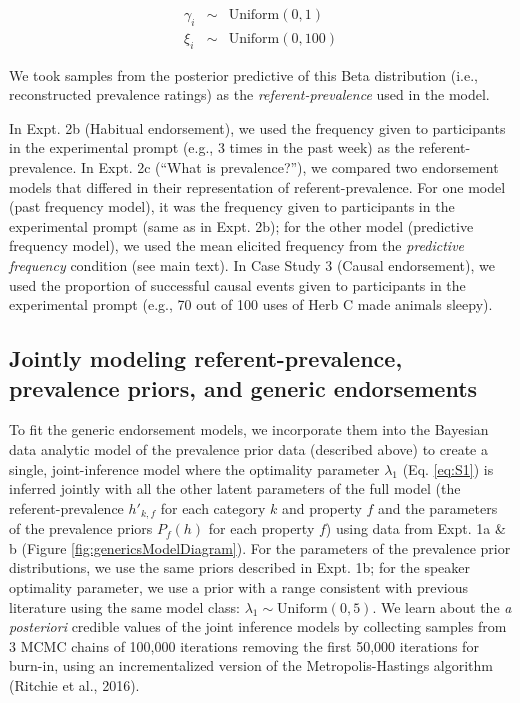 \documentclass[english,floatsintext,man]{apa6}
\theoremstyle{definition}
\theoremstyle{definition}
\theoremstyle{definition}
\theoremstyle{remark}
\begin{document}
\begin{eqnarray*}
\gamma_i & \sim & \text{Uniform}(0, 1) \\
\xi_i & \sim & \text{Uniform}(0, 100)
\end{eqnarray*}

We took samples from the posterior predictive of this Beta distribution
(i.e., reconstructed prevalence ratings) as the
\emph{referent-prevalence} used in the model.

In Expt. 2b (Habitual endorsement), we used the frequency given to
participants in the experimental prompt (e.g., 3 times in the past week)
as the referent-prevalence. In Expt. 2c (\enquote{What is prevalence?}),
we compared two endorsement models that differed in their representation
of referent-prevalence. For one model (past frequency model), it was the
frequency given to participants in the experimental prompt (same as in
Expt. 2b); for the other model (predictive frequency model), we used the
mean elicited frequency from the \emph{predictive frequency} condition
(see main text). In Case Study 3 (Causal endorsement), we used the
proportion of successful causal events given to participants in the
experimental prompt (e.g., 70 out of 100 uses of Herb C made animals
sleepy).

\subsection{Jointly modeling referent-prevalence, prevalence priors, and
generic
endorsements}\label{jointly-modeling-referent-prevalence-prevalence-priors-and-generic-endorsements}

To fit the generic endorsement models, we incorporate them into the
Bayesian data analytic model of the prevalence prior data (described
above) to create a single, joint-inference model where the optimality
parameter \(\lambda_1\) (Eq. \ref{eq:S1}) is inferred jointly with all
the other latent parameters of the full model (the referent-prevalence
\(h'_{k, f}\) for each category \(k\) and property \(f\) and the
parameters of the prevalence priors \(P_f(h)\) for each property \(f\))
using data from Expt. 1a \& b (Figure \ref{fig:genericsModelDiagram}).
For the parameters of the prevalence prior distributions, we use the
same priors described in Expt. 1b; for the speaker optimality parameter,
we use a prior with a range consistent with previous literature using
the same model class: \(\lambda_1 \sim \text{Uniform}(0,5)\). We learn
about the \emph{a posteriori} credible values of the joint inference
models by collecting samples from 3 MCMC chains of 100,000 iterations
removing the first 50,000 iterations for burn-in, using an
incrementalized version of the Metropolis-Hastings algorithm (Ritchie et
al., 2016).
\end{document}
